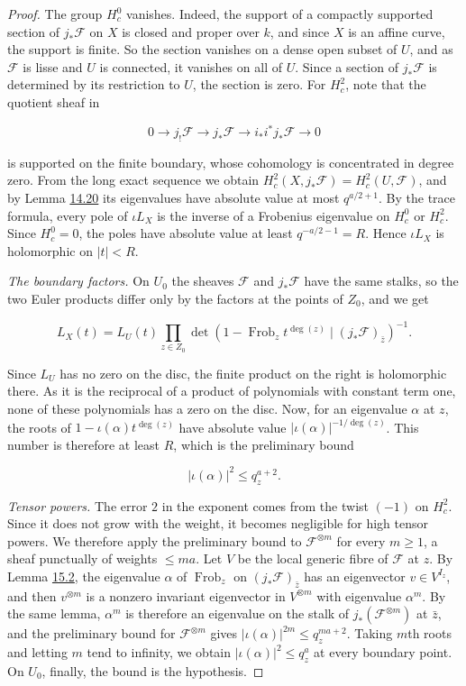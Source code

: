 \documentclass[11pt]{article}
\begin{document}
\begin{proof}[{Proof}]
The group \(H^0_c\) vanishes. Indeed, the support of a compactly supported section of \(j_*\mathcal F\) on \(X\) is closed and proper over \(k\), and since \(X\) is an affine curve, the support is finite. So the section vanishes on a dense open subset of \(U\), and as \(\mathcal F\) is lisse and \(U\) is connected, it vanishes on all of \(U\). Since a section of \(j_*\mathcal F\) is determined by its restriction to \(U\), the section is zero. For \(H^2_c\), note that the quotient sheaf in

\[
0\longrightarrow j_!\mathcal F\longrightarrow j_*\mathcal F
\longrightarrow i_*i^*j_*\mathcal F\longrightarrow0
\]

is supported on the finite boundary, whose cohomology is concentrated in degree zero.  From the long exact sequence we obtain \(H_c^2(X,j_*\mathcal F)=H_c^2(U,\mathcal F)\), and by Lemma \hyperref[bp104]{14.20} its eigenvalues have absolute value at most \(q^{a/2+1}\).  By the trace formula, every pole of \(\iota L_X\) is the inverse of a Frobenius eigenvalue on \(H^0_c\) or \(H^2_c\). Since \(H^0_c=0\), the poles have absolute value at least \(q^{-a/2-1}=R\). Hence \(\iota L_X\) is holomorphic on \(|t|<R\).

\emph{The boundary factors.} On \(U_0\) the sheaves \(\mathcal F\) and \(j_*\mathcal F\) have the same stalks, so the two Euler products differ only by the factors at the points of \(Z_0\), and we get

\[
L_X(t)=L_U(t)\prod_{z\in Z_0}
\det(1-\operatorname{Frob}_z t^{\deg(z)}\mid(j_*\mathcal F)_{\bar z})^{-1}.
\]

Since \(L_U\) has no zero on the disc, the finite product on the right is holomorphic there. As it is the reciprocal of a product of polynomials with constant term one, none of these polynomials has a zero on the disc.  Now, for an eigenvalue \(\alpha\) at \(z\), the roots of \(1-\iota(\alpha)t^{\deg(z)}\) have absolute value \(|\iota(\alpha)|^{-1/\deg(z)}\). This number is therefore at least \(R\), which is the preliminary bound

\[
|\iota(\alpha)|^2\le q_z^{a+2}.
\]

\emph{Tensor powers.} The error \(2\) in the exponent comes from the twist \((-1)\) on \(H^2_c\). Since it does not grow with the weight, it becomes negligible for high tensor powers. We therefore apply the preliminary bound to \(\mathcal F^{\otimes m}\) for every \(m\ge1\), a sheaf punctually of weights \(\le ma\).  Let \(V\) be the local generic fibre of \(\mathcal F\) at \(z\). By Lemma \hyperref[bp127]{15.2}, the eigenvalue \(\alpha\) of \(\operatorname{Frob}_z\) on \((j_*\mathcal F)_{\bar z}\) has an eigenvector \(v\in V^{I_z}\), and then \(v^{\otimes m}\) is a nonzero invariant eigenvector in \(V^{\otimes m}\) with eigenvalue \(\alpha^m\). By the same lemma, \(\alpha^m\) is therefore an eigenvalue on the stalk of \(j_*(\mathcal F^{\otimes m})\) at \(\bar z\), and the preliminary bound for \(\mathcal F^{\otimes m}\) gives \(|\iota(\alpha)|^{2m}\le q_z^{ma+2}\).  Taking \(m\)th roots and letting \(m\) tend to infinity, we obtain \(|\iota(\alpha)|^2\le q_z^a\) at every boundary point. On \(U_0\), finally, the bound is the hypothesis.
\end{proof}
\end{document}
